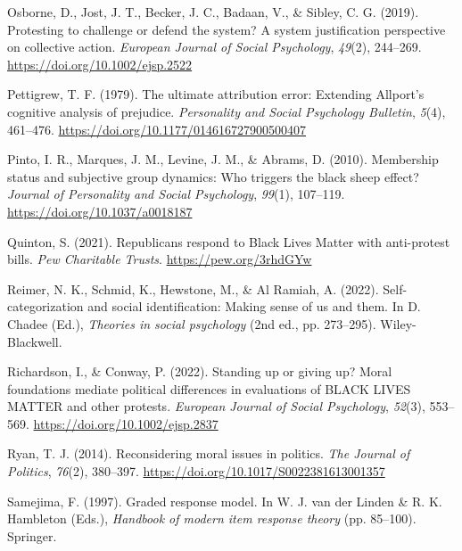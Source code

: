 \documentclass[12pt, letterpaper]{article}
\newenvironment{CSLReferences}[2]{}{}
\begin{document}
\begin{CSLReferences}{1}{0}
\leavevmode{}%
Osborne, D., Jost, J. T., Becker, J. C., Badaan, V., \& Sibley, C. G.
(2019). Protesting to challenge or defend the system? {A} system
justification perspective on collective action. \emph{European Journal
of Social Psychology}, \emph{49}(2), 244--269.
\url{https://doi.org/10.1002/ejsp.2522}

\leavevmode{}%
Pettigrew, T. F. (1979). The ultimate attribution error: Extending
{Allport}'s cognitive analysis of prejudice. \emph{Personality and
Social Psychology Bulletin}, \emph{5}(4), 461--476.
\url{https://doi.org/10.1177/014616727900500407}

\leavevmode{}%
Pinto, I. R., Marques, J. M., Levine, J. M., \& Abrams, D. (2010).
Membership status and subjective group dynamics: Who triggers the black
sheep effect? \emph{Journal of Personality and Social Psychology},
\emph{99}(1), 107--119. \url{https://doi.org/10.1037/a0018187}

\leavevmode{}%
Quinton, S. (2021). Republicans respond to {Black Lives Matter} with
anti-protest bills. \emph{Pew Charitable Trusts}.
\url{https://pew.org/3rhdGYw}

\leavevmode{}%
Reimer, N. K., Schmid, K., Hewstone, M., \& Al Ramiah, A. (2022).
Self-categorization and social identification: Making sense of us and
them. In D. Chadee (Ed.), \emph{Theories in social psychology} (2nd ed.,
pp. 273--295). Wiley-Blackwell.

\leavevmode{}%
Richardson, I., \& Conway, P. (2022). Standing up or giving up? {Moral}
foundations mediate political differences in evaluations of {BLACK}
{LIVES} {MATTER} and other protests. \emph{European Journal of Social
Psychology}, \emph{52}(3), 553--569.
\url{https://doi.org/10.1002/ejsp.2837}

\leavevmode{}%
Ryan, T. J. (2014). Reconsidering moral issues in politics. \emph{The
Journal of Politics}, \emph{76}(2), 380--397.
\url{https://doi.org/10.1017/S0022381613001357}

\leavevmode{}%
Samejima, F. (1997). Graded response model. In W. J. van der Linden \&
R. K. Hambleton (Eds.), \emph{Handbook of modern item response theory}
(pp. 85--100). Springer.


\end{CSLReferences}
\end{document}
